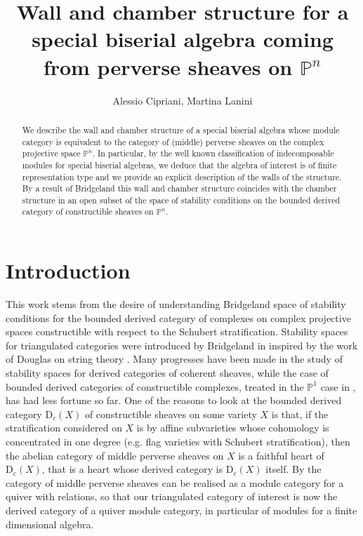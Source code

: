 \documentclass[11pt]{amsart}
\title[Wall and chamber structure for perverse sheaves on projective spaces]{Wall and chamber structure for a special biserial algebra coming from perverse sheaves on $\mathbb{P}^n$}
\author{Alessio Cipriani, Martina Lanini}
\theoremstyle{definition}
\newcommand{\cat}[1]{\mathrm{#1}}
\newcommand{\constr}[2]{\cat{D}_{#1}({#2})}
\begin{document}
\maketitle

\begin{abstract}
    We describe the wall and chamber structure of a special biserial algebra whose module category is equivalent to the category of (middle) perverse sheaves on the complex projective space $\mathbb{P}^n$.
    In particular, by the well known classification of indecomposable modules for special biserial algebras, we deduce that the algebra of interest is of finite representation type and we provide an explicit description of the walls of the structure.
    By a result of Bridgeland this wall and chamber structure coincides with the chamber structure in an open subset of the space of stability conditions on the bounded derived category of constructible sheaves on $\mathbb{P}^n$.
\end{abstract}

\section{Introduction}
This work stems from the desire of understanding Bridgeland space of stability conditions for the bounded derived category of complexes on complex projective spaces constructible with respect to the Schubert stratification. Stability spaces for triangulated categories were introduced by Bridgeland in \cite{bridgeland07} inspired by the work of Douglas on string theory \cite{douglas}. Many progresses have been made in the study of stability spaces for derived categories of coherent sheaves, while the case of bounded derived categories of constructible complexes, treated in the $\mathbb{P}^1$ case in \cite{MR2739061}, has had less fortune so far. One of the reasons to look at the bounded derived category $\constr{c}{X}$ of constructible sheaves on some variety $X$ is that, if the stratification considered on $X$ is by affine subvarieties whose cohomology is concentrated in one degree (e.g. flag varieties with Schubert stratification), then the abelian category of middle perverse sheaves on $X$ is a faithful heart of $\constr{c}{X}$, that is a heart whose derived category is $\constr{c}{X}$  itself.  By \cite{MR4349392} the category of middle perverse sheaves can be realised as a module category for a quiver with relations, so that our triangulated category of interest is now the derived category of a quiver module category, in particular of modules for a finite dimensional algebra.
\end{document}
